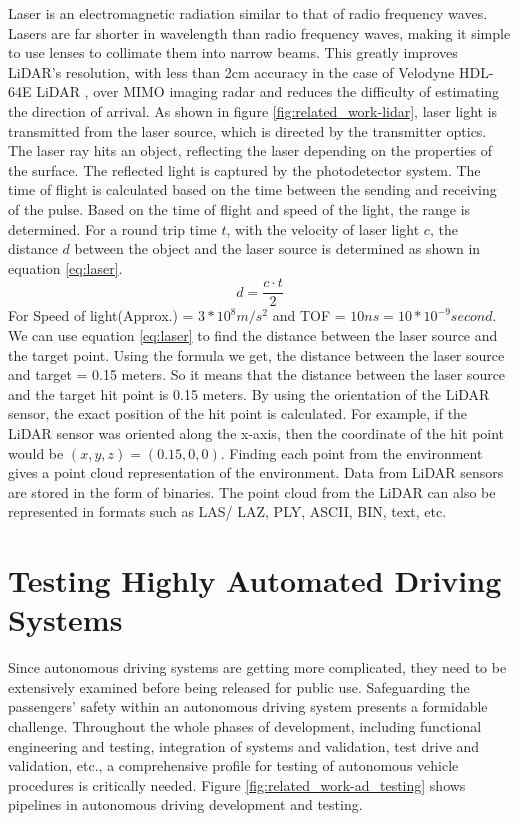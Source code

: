 Laser is an electromagnetic radiation similar to that of radio frequency waves. Lasers are far shorter in wavelength than radio frequency waves, making it simple to use lenses to collimate them into narrow beams. This greatly improves LiDAR's resolution, with less than 2cm accuracy in the case of Velodyne HDL-64E LiDAR \parencite{velodyne_64}, over MIMO imaging radar and reduces the difficulty of estimating the direction of arrival. As shown in figure \ref{fig:related_work-lidar}, laser light is transmitted from the laser source, which is directed by the transmitter optics. The laser ray hits an object, reflecting the laser depending on the properties of the surface. The reflected light is captured by the photodetector system. The time of flight is calculated based on the time between the sending and receiving of the pulse. Based on the time of flight and speed of the light, the range is determined. For a round trip time \(t\), with the velocity of laser light \(c\), the distance \(d\) between the object and the laser source is determined as shown in equation \ref{eq:laser}.
\begin{equation}\label{eq:laser}
    d = \frac{c \cdot t}{2}
\end{equation}
For Speed of light(Approx.) = \(3 * 10^8 m/s^2\) and TOF = \(10 ns = 10 * 10^{-9} second\). We can use equation \ref{eq:laser} to find the distance between the laser source and the target point. Using the formula we get, the distance between the laser source and target = 0.15 meters. So it means that the distance between the laser source and the target hit point is 0.15 meters. By using the orientation of the LiDAR sensor, the exact position of the hit point is calculated. For example, if the LiDAR sensor was oriented along the x-axis, then the coordinate of the hit point would be \((x, y, z) = (0.15, 0, 0)\). Finding each point from the environment gives a point cloud representation of the environment. Data from LiDAR sensors are stored in the form of binaries. The point cloud from the LiDAR can also be represented in formats such as LAS/ LAZ, PLY, ASCII, BIN, text, etc.

\section{Testing Highly Automated Driving Systems}
Since autonomous driving systems are getting more complicated, they need to be extensively examined before being released for public use. Safeguarding the passengers' safety within an autonomous driving system presents a formidable challenge. Throughout the whole phases of development, including functional engineering and testing, integration of systems and validation, test drive and validation, etc., a comprehensive profile for testing of autonomous vehicle procedures is critically needed. Figure \ref{fig:related_work-ad_testing} shows pipelines in autonomous driving development and testing.

